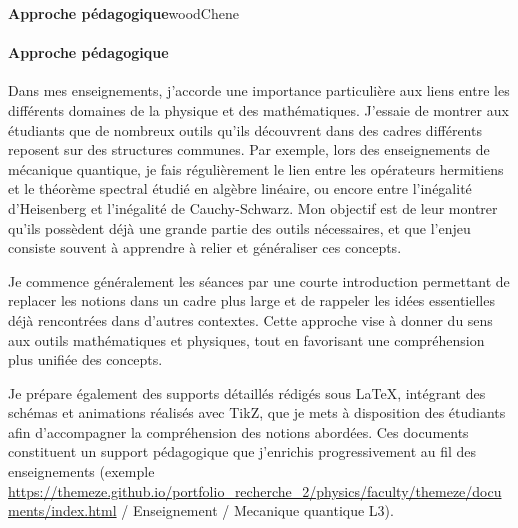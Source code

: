 \EncadreDeux
{}{{\bf \textsf{Approche pédagogique}}}{woodChene}{
    \paragraph{Approche pédagogique}

    Dans mes enseignements, j’accorde une importance particulière aux liens entre
    les différents domaines de la physique et des mathématiques. J’essaie de
    montrer aux étudiants que de nombreux outils qu’ils découvrent dans des cadres
    différents reposent sur des structures communes. Par exemple, lors des
    enseignements de mécanique quantique, je fais régulièrement le lien entre les
    opérateurs hermitiens et le théorème spectral étudié en algèbre linéaire, ou
    encore entre l’inégalité d’Heisenberg et l’inégalité de Cauchy-Schwarz. Mon
    objectif est de leur montrer qu’ils possèdent déjà une grande partie des outils
    nécessaires, et que l’enjeu consiste souvent à apprendre à relier et
    généraliser ces concepts.

    Je commence généralement les séances par une courte introduction permettant de
    replacer les notions dans un cadre plus large et de rappeler les idées
    essentielles déjà rencontrées dans d’autres contextes. Cette approche vise à
    donner du sens aux outils mathématiques et physiques, tout en favorisant une
    compréhension plus unifiée des concepts.

    Je prépare également des supports détaillés rédigés sous \LaTeX{}, intégrant
    des schémas et animations réalisés avec TikZ, que je mets à disposition des
    étudiants afin d’accompagner la compréhension des notions abordées. Ces
    documents constituent un support pédagogique que j’enrichis progressivement au
    fil des enseignements (exemple
    \url{https://themeze.github.io/portfolio_recherche_2/physics/faculty/themeze/documents/index.html}
    / Enseignement / Mecanique quantique L3). }



